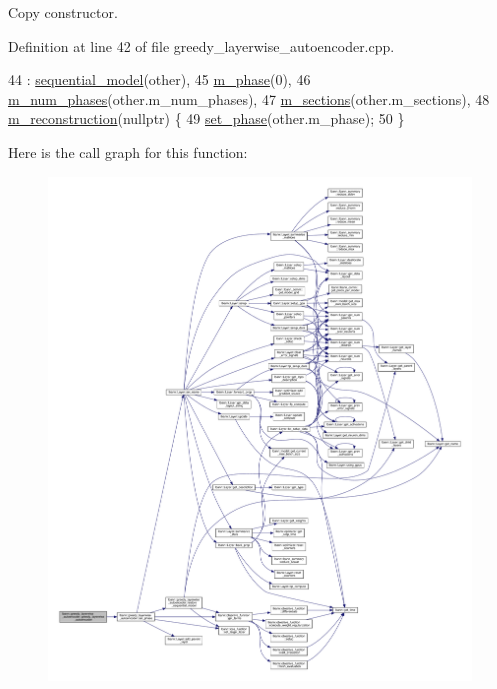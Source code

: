 Copy constructor. 

Definition at line 42 of file greedy\+\_\+layerwise\+\_\+autoencoder.\+cpp.


\begin{DoxyCode}
44   : \hyperlink{classlbann_1_1sequential__model_a269f246d881186f8e8608dc4758cc6a6}{sequential\_model}(other),
45     \hyperlink{classlbann_1_1greedy__layerwise__autoencoder_a1baf1b5e7fdb5d006f443edbb0bb2973}{m\_phase}(0),
46     \hyperlink{classlbann_1_1greedy__layerwise__autoencoder_a792010a00136ee1e024b6e5d38c77386}{m\_num\_phases}(other.m\_num\_phases),
47     \hyperlink{classlbann_1_1greedy__layerwise__autoencoder_aacb3dbf01c38f46a32927722420c5d41}{m\_sections}(other.m\_sections),
48     \hyperlink{classlbann_1_1greedy__layerwise__autoencoder_a8238d2e3e723543c8b6f7f5c61a9ca06}{m\_reconstruction}(\textcolor{keyword}{nullptr}) \{
49   \hyperlink{classlbann_1_1greedy__layerwise__autoencoder_a5f237f1f6285475c5493a7d15dc32096}{set\_phase}(other.m\_phase);
50 \}
\end{DoxyCode}
Here is the call graph for this function\+:\nopagebreak
\begin{figure}[H]
\begin{center}
\leavevmode
\includegraphics[width=350pt]{classlbann_1_1greedy__layerwise__autoencoder_adf8750be08e34891701a24678f703acd_cgraph}
\end{center}
\end{figure}
\mbox{\label{classlbann_1_1greedy__layerwise__autoencoder_a74aa0b263d78b6a7a8ac32cde6e05c4c}} 
